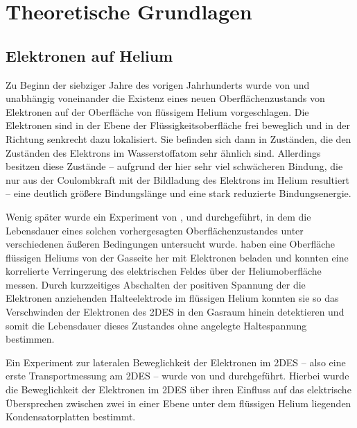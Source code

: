 \chapter{Theoretische Grundlagen}
\label{chap:theo}

\section{Elektronen auf Helium}
Zu Beginn der siebziger Jahre des vorigen Jahrhunderts wurde von  \cite{Col69} und  \cite{Shi70} unabhängig voneinander die Existenz eines neuen Oberflächenzustands von Elektronen auf der Oberfläche von flüssigem Helium vorgeschlagen. Die Elektronen sind in der Ebene der Flüssigkeitsoberfläche frei beweglich und in der Richtung senkrecht dazu lokalisiert. Sie befinden sich dann in Zuständen, die den Zuständen des Elektrons im Wasserstoffatom sehr ähnlich sind.
Allerdings besitzen diese Zustände -- aufgrund der hier sehr viel schwächeren Bindung, die nur aus der Coulombkraft mit der Bildladung des Elektrons im Helium resultiert -- eine deutlich größere Bindungslänge und eine stark reduzierte Bindungsenergie.

Wenig später wurde ein Experiment  von ,  und  \cite{Wil71} durchgeführt, in dem die Lebensdauer eines solchen vorhergesagten Oberflächenzustandes unter verschiedenen äußeren Bedingungen untersucht wurde.  \ea{} haben eine Oberfläche flüssigen Heliums von der Gasseite her mit Elektronen beladen und konnten eine korrelierte Verringerung des elektrischen Feldes über der Heliumoberfläche messen. Durch kurzzeitiges Abschalten der positiven Spannung der die Elektronen anziehenden Halteelektrode im flüssigen Helium konnten sie so das Verschwinden der Elektronen des 2DES in den Gasraum hinein detektieren und somit die Lebensdauer dieses Zustandes ohne angelegte Haltespannung bestimmen.

Ein Experiment zur lateralen Beweglichkeit der Elektronen im 2DES -- also eine erste Transportmessung am 2DES -- wurde von  und  \cite{Som71} durchgeführt. Hierbei wurde die Beweglichkeit der Elektronen im 2DES über ihren Einfluss auf das elektrische Übersprechen zwischen zwei in einer Ebene unter dem flüssigen Helium liegenden Kondensatorplatten bestimmt.

